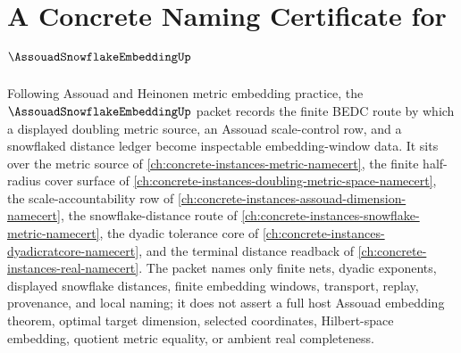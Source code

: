\chapter{A Concrete Naming Certificate for $\AssouadSnowflakeEmbeddingUp$}
\label{ch:concrete-instances-assouad-snowflake-embedding-namecert}

Following Assouad and Heinonen metric embedding practice, the $\AssouadSnowflakeEmbeddingUp$ packet records the finite BEDC route by which a displayed doubling metric source, an Assouad scale-control row, and a snowflaked distance ledger become inspectable embedding-window data. It sits over the metric source of \autoref{ch:concrete-instances-metric-namecert}, the finite half-radius cover surface of \autoref{ch:concrete-instances-doubling-metric-space-namecert}, the scale-accountability row of \autoref{ch:concrete-instances-assouad-dimension-namecert}, the snowflake-distance route of \autoref{ch:concrete-instances-snowflake-metric-namecert}, the dyadic tolerance core of \autoref{ch:concrete-instances-dyadicratcore-namecert}, and the terminal distance readback of \autoref{ch:concrete-instances-real-namecert}. The packet names only finite nets, dyadic exponents, displayed snowflake distances, finite embedding windows, transport, replay, provenance, and local naming; it does not assert a full host Assouad embedding theorem, optimal target dimension, selected coordinates, Hilbert-space embedding, quotient metric equality, or ambient real completeness.

